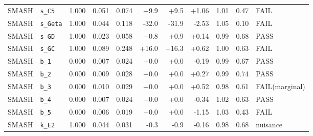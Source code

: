 \begin{tabular}{llrrrrrrrrl}
SMASH & \texttt{s\_C5} & 1.000 & 0.051 & 0.074 & +9.9 & +9.5 & +1.06 & 1.01 & 0.47 & FAIL \\
SMASH & \texttt{s\_Geta} & 1.000 & 0.044 & 0.118 & -32.0 & -31.9 & -2.53 & 1.05 & 0.10 & FAIL \\
SMASH & \texttt{s\_GD} & 1.000 & 0.023 & 0.058 & +0.8 & +0.9 & +0.14 & 0.99 & 0.68 & PASS \\
SMASH & \texttt{s\_GC} & 1.000 & 0.089 & 0.248 & +16.0 & +16.3 & +0.62 & 1.00 & 0.63 & FAIL \\
SMASH & \texttt{b\_1} & 0.000 & 0.007 & 0.024 & +0.0 & +0.0 & -0.19 & 0.99 & 0.67 & PASS \\
SMASH & \texttt{b\_2} & 0.000 & 0.009 & 0.028 & +0.0 & +0.0 & +0.27 & 0.99 & 0.74 & PASS \\
SMASH & \texttt{b\_3} & 0.000 & 0.010 & 0.029 & +0.0 & +0.0 & +0.52 & 0.98 & 0.61 & FAIL(marginal) \\
SMASH & \texttt{b\_4} & 0.000 & 0.007 & 0.024 & +0.0 & +0.0 & -0.34 & 1.02 & 0.63 & PASS \\
SMASH & \texttt{b\_5} & 0.000 & 0.006 & 0.019 & +0.0 & +0.0 & -1.15 & 1.03 & 0.43 & FAIL \\
SMASH & \texttt{k\_E2} & 1.000 & 0.044 & 0.031 & -0.3 & -0.9 & -0.16 & 0.98 & 0.68 & nuisance \\
\bottomrule
\end{tabular}
